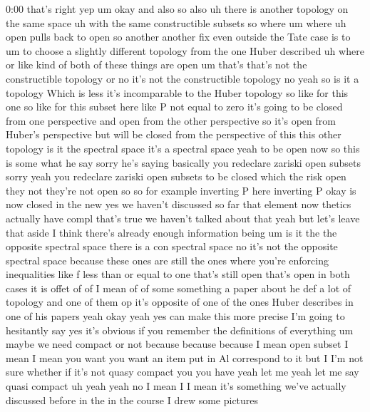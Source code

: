\begin{unfinished}{0:00}
that's  right
yep  um
okay  and  also  so
also  uh  there  is  another
topology  on  the  same
space  uh  with  the  same  constructible
subsets  so  where  um  where  uh  open  pulls
back  to
open
so  another  another  fix  even  outside  the
Tate  case  is  to  um  to  choose  a  slightly
different  topology  from  the  one  Huber
described  uh  where  or  like  kind  of  both
of  these  things  are
open  um  that's  that's  not  the
constructible  topology  or  no  it's  not
the  constructible  topology  no  yeah  so  is
it  a  topology  Which  is  less
it's  incomparable  to  the  Huber
topology  so  like  for  this  one  so  like
for  this  subset  here  like  P  not  equal  to
zero  it's  going  to  be  closed  from  one
perspective  and  open  from  the  other
perspective  so  it's  open  from  Huber's
perspective  but  will  be  closed  from  the
perspective  of
this  this  other
topology  is  it  the  spectral  space  it's  a
spectral  space
yeah
to  be  open
now  so  this  is  some  what  he  say  sorry
he's  saying  basically  you  redeclare
zariski  open  subsets  sorry  yeah  you
redeclare  zariski  open  subsets  to  be
closed  which  the  risk  open  they  not
they're  not
open  so  so  for  example  inverting  P
here  inverting
P
okay  is  now  closed  in  the  new
yes  we  haven't  discussed  so  far
that  element  now  thetics  actually  have
compl  that's  true  we  haven't  talked
about  that  yeah  but  let's  leave  that
aside  I  think  there's  already  enough
information  being
um  is  it  the  the  opposite  spectral  space
there  is  a  con  spectral  space  no  it's
not  the  opposite  spectral  space  because
these  ones  are  still  the  ones  where
you're  enforcing  inequalities  like  f
less  than  or  equal  to  one  that's  still
open  that's  open  in  both
cases  it  is  offet  of  of  I  mean  of  of
some  something  a  paper  about  he  def  a
lot  of  topology  and  one  of  them  op  it's
opposite  of  one  of  the  ones  Huber
describes  in  one  of  his  papers  yeah  okay
yeah
yes  can  make  this  more
precise  I'm  going  to  hesitantly  say  yes
it's  obvious  if  you  remember  the
definitions  of  everything  um  maybe  we
need  compact  or  not  because  because
because  I  mean  open  subset  I  mean  I  mean
you  want  you  want  an  item  put  in  Al
correspond  to  it  but  I  I'm  not  sure
whether  if  it's  not  quasy  compact  you
you  have  yeah  let  me  yeah  let  me  say
quasi  compact  uh  yeah
yeah  no  I  mean  I  I  mean  it's  something
we've  actually  discussed  before  in  the
in  the  course  I  drew  some  pictures

\end{unfinished}
